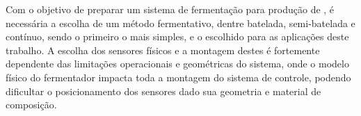 \startchapter[title={Metodologia}]
	Com o objetivo de preparar um sistema de fermentação para produção de , é necessária a escolha de um método fermentativo, dentre batelada, semi-batelada e contínuo, sendo o primeiro o mais simples, e o escolhido para as aplicações deste trabalho. A escolha dos sensores físicos e a montagem destes é fortemente dependente das limitações operacionais e geométricas do sistema, onde o modelo físico do fermentador impacta toda a montagem do sistema de controle, podendo dificultar o posicionamento dos sensores dado sua geometria e material de composição.

	
	
	
\stopchapter
